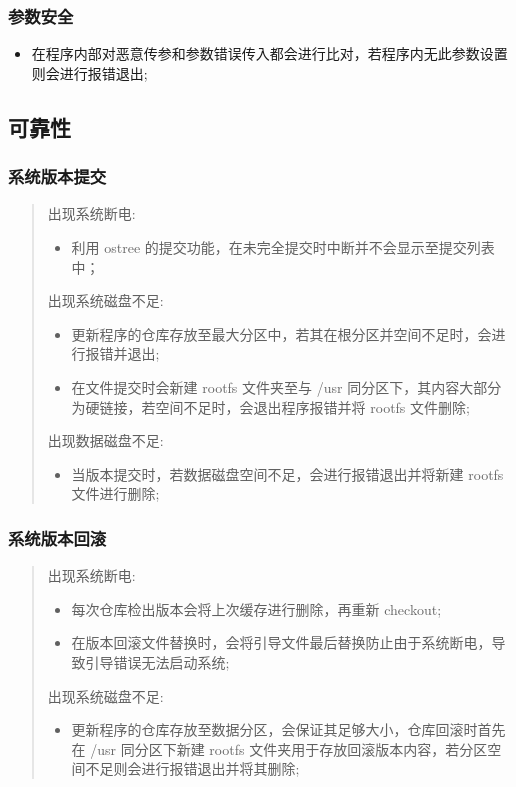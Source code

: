\documentclass{utart}
\begin{document}
\subsubsection{参数安全}
\begin{itemize}[leftmargin=4em]
  \item 在程序内部对恶意传参和参数错误传入都会进行比对，若程序内无此参数设置则会进行报错退出;
\end{itemize}

\subsection{可靠性}
\subsubsection{系统版本提交}
\begin{quote}
出现系统断电:
\begin{itemize}
  \item 利用 ostree 的提交功能，在未完全提交时中断并不会显示至提交列表中；
\end{itemize}
出现系统磁盘不足:
\begin{itemize}
  \item 更新程序的仓库存放至最大分区中，若其在根分区并空间不足时，会进行报错并退出;
  \item 在文件提交时会新建 rootfs 文件夹至与 /usr 同分区下，其内容大部分为硬链接，若空间不足时，会退出程序报错并将 rootfs 文件删除;
\end{itemize}
出现数据磁盘不足:
\begin{itemize}
  \item  当版本提交时，若数据磁盘空间不足，会进行报错退出并将新建 rootfs 文件进行删除;
\end{itemize}
\end{quote}

\subsubsection{系统版本回滚}
\begin{quote}
出现系统断电:
\begin{itemize}
  \item 每次仓库检出版本会将上次缓存进行删除，再重新 checkout;
  \item 在版本回滚文件替换时，会将引导文件最后替换防止由于系统断电，导致引导错误无法启动系统;
\end{itemize}
出现系统磁盘不足:
\begin{itemize}
  \item 更新程序的仓库存放至数据分区，会保证其足够大小，仓库回滚时首先在 /usr 同分区下新建 rootfs 文件夹用于存放回滚版本内容，若分区空间不足则会进行报错退出并将其删除;
\end{itemize}
\end{quote}
\end{document}
